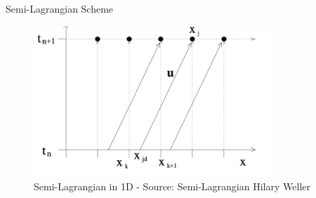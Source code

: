\begin{frame}{Semi-Lagrangian Scheme}
    
    \begin{figure}
        \centering
        \includegraphics[width=0.8\textwidth]{images/11.png}
        \caption{Semi-Lagrangian in 1D - Source: Semi-Lagrangian Hilary Weller}
    \end{figure}

\end{frame}